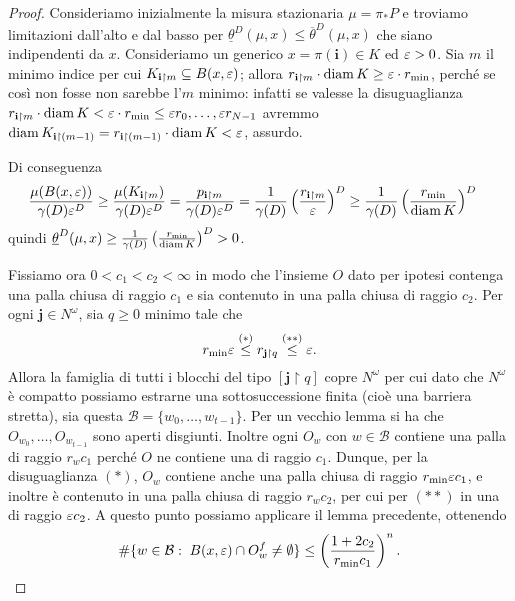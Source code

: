 \begin{proof}
	Consideriamo inizialmente la misura stazionaria $\mu = \pi_{*}P$ e troviamo limitazioni dall'alto e dal basso per $\underline\theta^{D}(\mu,x)\leq\overline\theta^{D}(\mu,x)$ che siano indipendenti da $x$.
	Consideriamo un generico $x = \pi(\mathbf i)\in K$ ed $\varepsilon>0$. Sia $m$ il minimo indice per cui $K_{\mathbf i\upharpoonright m} \subseteq B(x,\varepsilon)$; allora $r_{\mathbf i\upharpoonright m}\cdot \operatorname{diam} K\geq \varepsilon\cdot r_{\min}$, perché se così non fosse non sarebbe l'$m$ minimo: infatti se valesse la disuguaglianza $r_{\mathbf i\upharpoonright m}\cdot \operatorname{diam} K< \varepsilon\cdot r_{\min} \leq \varepsilon r_{0},\dots,\varepsilon r_{N-1}$ avremmo $\operatorname{diam} K_{\mathbf i\upharpoonright(m-1)} = r_{\mathbf i\upharpoonright(m-1)}\cdot\operatorname{diam} K <\varepsilon$, assurdo. 
	
	Di conseguenza 
	\begin{align*}
	\frac{\mu(B(x,\varepsilon))}{\gamma(D)\varepsilon^{D}} & \geq
	\frac{\mu(K_{\mathbf i\upharpoonright m})}{\gamma(D)\varepsilon^{D}} = 
	\frac{p_{\mathbf i \upharpoonright m}}{\gamma(D)\varepsilon^{D}} = 
	\frac{1}{\gamma(D)}\left(\frac{r_{\mathbf i \upharpoonright m}}{\varepsilon}\right)^{D} \geq
	\frac{1}{\gamma(D)}\left(\frac{r_{\min}}{\operatorname{diam} K}\right)^{D}
	\end{align*}
	quindi $\underline\theta^{D}(\mu, x) \geq \frac{1}{\gamma(D)}\left(\frac{r_{\min}}{\operatorname{diam} K}\right)^{D} >0$.
	
	Fissiamo ora $0<c_{1}<c_{2}<\infty$ in modo che l'insieme $O$ dato per ipotesi contenga una palla chiusa di raggio $c_{1}$ e sia contenuto in una palla chiusa di raggio $c_{2}$. Per ogni $\mathbf j \in N^{\omega}$, sia $q\geq0$ minimo tale che $$r_{\min}\varepsilon\overset{(*)}{\leq} r_{\mathbf j\upharpoonright q}\overset{(**)}{\leq} \varepsilon.$$
	Allora la famiglia di tutti i blocchi del tipo $[\mathbf j\upharpoonright q]$ copre $N^{\omega}$ per cui dato che $N^{\omega}$ è compatto possiamo estrarne una sottosuccessione finita (cioè una barriera stretta), sia questa $\mathcal B = \{w_{0}, \dots, w_{t-1}\}$.
	Per un vecchio lemma si ha che $O_{w_{0}},\dots,O_{w_{t-1}}$ sono aperti disgiunti. Inoltre ogni $O_{w}$ con $w\in\mathcal B$ contiene una palla di raggio $r_{w}c_{1}$ perché $O$ ne contiene una di raggio $c_{1}$.
	Dunque, per la disuguaglianza $(*)$, $O_{w}$ contiene anche una palla chiusa di raggio $r_{\min}\varepsilon c_{1}$, e inoltre è contenuto in una palla chiusa di raggio $r_{w}c_{2}$, per cui per $(**)$ in una di raggio $\varepsilon c_{2}$.
	A questo punto possiamo applicare il lemma precedente, ottenendo 
	$$\#\{w\in\mathcal B:\; B(x,\varepsilon)\cap O_{w}^{f}\neq\emptyset\}\leq \left(\frac{1+2c_{2}}{r_{\min}c_{1}}\right)^{n}.$$
	

\end{proof}
